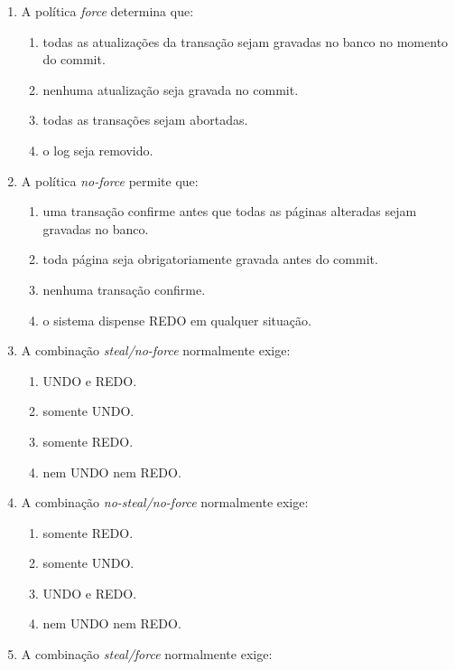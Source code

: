 \documentclass[12pt,a4paper]{article}
\begin{document}
\begin{enumerate}[label=\textbf{Q\arabic*.}]
\item A política \textit{force} determina que:

\begin{enumerate}[label=\alph*)]
    \item todas as atualizações da transação sejam gravadas no banco no momento do commit.
    \item nenhuma atualização seja gravada no commit.
    \item todas as transações sejam abortadas.
    \item o log seja removido.
\end{enumerate}

\item A política \textit{no-force} permite que:

\begin{enumerate}[label=\alph*)]
    \item uma transação confirme antes que todas as páginas alteradas sejam gravadas no banco.
    \item toda página seja obrigatoriamente gravada antes do commit.
    \item nenhuma transação confirme.
    \item o sistema dispense REDO em qualquer situação.
\end{enumerate}

\item A combinação \textit{steal/no-force} normalmente exige:

\begin{enumerate}[label=\alph*)]
    \item UNDO e REDO.
    \item somente UNDO.
    \item somente REDO.
    \item nem UNDO nem REDO.
\end{enumerate}

\item A combinação \textit{no-steal/no-force} normalmente exige:

\begin{enumerate}[label=\alph*)]
    \item somente REDO.
    \item somente UNDO.
    \item UNDO e REDO.
    \item nem UNDO nem REDO.
\end{enumerate}

\item A combinação \textit{steal/force} normalmente exige:


\end{enumerate}
\end{document}
